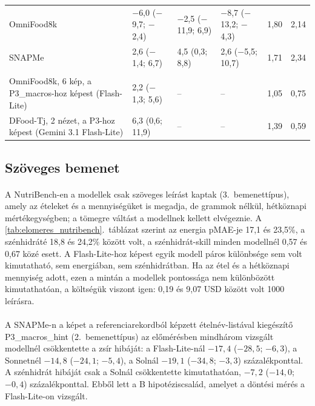 \begin{table}[p]
{\begin{tabular}{>{\raggedright\arraybackslash}p{3.3cm}lllll}
OmniFood8k & $-$6,0 ($-$9,7; $-$2,4) & $-$2,5 ($-$11,9; 6,9) & $-$8,7 ($-$13,2; $-$4,3) & 1,80 & 2,14 \\
SNAPMe & 2,6 ($-$1,4; 6,7) & 4,5 (0,3; 8,8) & 2,6 ($-$5,5; 10,7) & 1,71 & 2,34 \\
\hline
\multicolumn{6}{l}{\textit{P3\_density}} \\
OmniFood8k, 6 kép, a P3\_macros-hoz képest (Flash-Lite) & 2,2 ($-$1,3; 5,6) & -- & -- & 1,05 & 0,75 \\
DFood-Tj, 2 nézet, a P3-hoz képest (Gemini 3.1 Flash-Lite) & 6,3 (0,6; 11,9) & -- & -- & 1,39 & 0,59 \\
\hline
\end{tabular}}
\end{table}

\subsection{Szöveges bemenet}
\paragraph{}A NutriBench-en a modellek csak szöveges leírást kaptak (3.~bemenettípus), amely az 
ételeket és a mennyiségüket is megadja, de grammok nélkül, hétköznapi mértékegységben; a 
tömegre váltást a modellnek kellett elvégeznie. A \ref{tab:elomeres_nutribench}.~táblázat szerint az 
energia pMAE-je 17,1 és 23,5\%, a szénhidráté 18,8 és 24,2\% között volt, a szénhidrát-skill 
minden modellnél 0,57 és 0,67 közé esett. A Flash-Lite-hoz képest egyik modell páros különbsége sem 
volt kimutatható, sem energiában, sem szénhidrátban. Ha az étel és a hétköznapi mennyiség adott, ezen a 
mintán a modellek pontossága nem különbözött kimutathatóan, a költségük viszont igen: 
0,19 és 9,07 USD között volt 1000 leírásra.

\paragraph{}A SNAPMe-n a képet a referenciarekordból képzett ételnév-listával kiegészítő 
P3\_macros\_hint (2.~bemenettípus) az előmérésben mindhárom vizsgált modellnél csökkentette a zsír 
hibáját: a Flash-Lite-nál $-17{,}4$ ($-28{,}5$; $-6{,}3$), a Sonnetnél $-14{,}8$ ($-24{,}1$; $-5{,}4$), 
a Solnál $-19{,}1$ ($-34{,}8$; $-3{,}3$) százalékponttal. A szénhidrát hibáját csak a Solnál 
csökkentette kimutathatóan, $-7{,}2$ ($-14{,}0$; $-0{,}4$) százalékponttal. Ebből lett a B 
hipotéziscsalád, amelyet a döntési mérés a Flash-Lite-on vizsgált.

